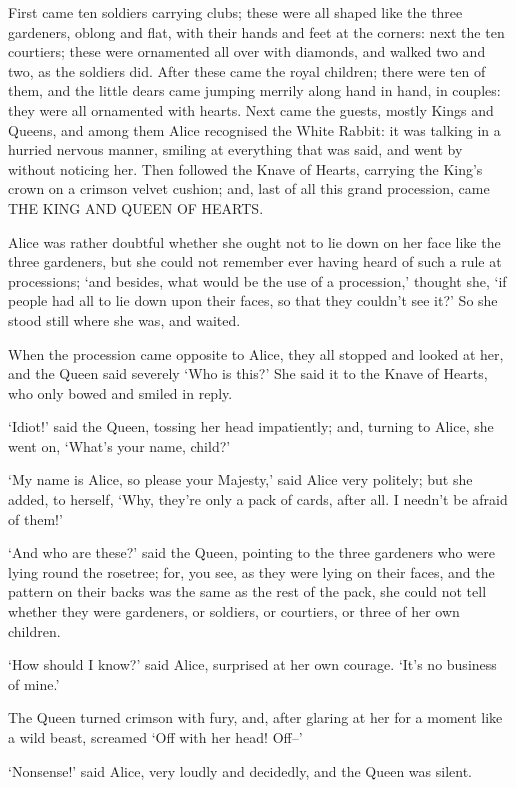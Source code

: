 \documentclass[statementpaper,twoside,openany]{memoir}
\begin{document}
First came ten soldiers carrying clubs; these were all shaped like the three gardeners, oblong and flat, with their hands and feet at the corners: next the ten courtiers; these were ornamented all over with diamonds, and walked two and two, as the soldiers did. After these came the royal children; there were ten of them, and the little dears came jumping merrily along hand in hand, in couples: they were all ornamented with hearts. Next came the guests, mostly Kings and Queens, and among them Alice recognised the White Rabbit: it was talking in a hurried nervous manner, smiling at everything that was said, and went by without noticing her. Then followed the Knave of Hearts, carrying the King's crown on a crimson velvet cushion; and, last of all this grand procession, came THE KING AND QUEEN OF HEARTS.

Alice was rather doubtful whether she ought not to lie down on her face like the three gardeners, but she could not remember ever having heard of such a rule at processions; `and besides, what would be the use of a procession,' thought she, `if people had all to lie down upon their faces, so that they couldn't see it?' So she stood still where she was, and waited.

When the procession came opposite to Alice, they all stopped and looked at her, and the Queen said severely `Who is this?' She said it to the Knave of Hearts, who only bowed and smiled in reply.

`Idiot!' said the Queen, tossing her head impatiently; and, turning to Alice, she went on, `What's your name, child?'

`My name is Alice, so please your Majesty,' said Alice very politely; but she added, to herself, `Why, they're only a pack of cards, after all. I needn't be afraid of them!'

`And who are these?' said the Queen, pointing to the three gardeners who were lying round the rosetree; for, you see, as they were lying on their faces, and the pattern on their backs was the same as the rest of the pack, she could not tell whether they were gardeners, or soldiers, or courtiers, or three of her own children.

`How should I know?' said Alice, surprised at her own courage. `It's no business of mine.'

The Queen turned crimson with fury, and, after glaring at her for a moment like a wild beast, screamed `Off with her head! Off--'

`Nonsense!' said Alice, very loudly and decidedly, and the Queen was silent.
\end{document}
